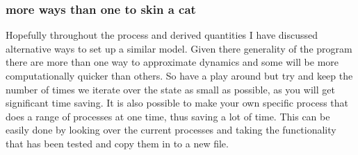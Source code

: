 \subsubsection*{more ways than one to skin a cat} 
Hopefully throughout the process and derived quantities I have discussed alternative ways to set up a similar model. Given there generality of the program there are more than one way to approximate dynamics and some will be more computationally quicker than others. So have a play around but try and keep the number of times we iterate over the state as small as possible, as you will get significant time saving. It is also possible to make your own specific process that does a range of processes at one time, thus saving a lot of time. This can be easily done by looking over the current processes and taking the functionality that has been tested and copy them in to a new file.
